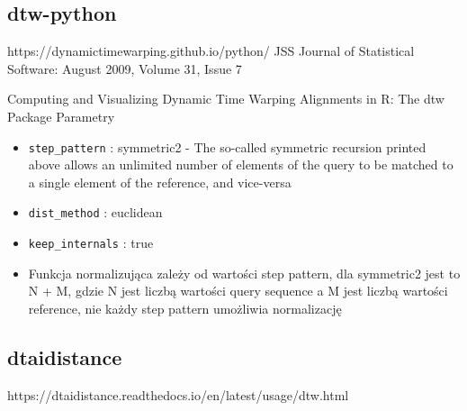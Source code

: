 \subsection{dtw-python}
https://dynamictimewarping.github.io/python/
\newline
JSS Journal of Statistical Software: August 2009, Volume 31, Issue 7 \par
Computing and Visualizing Dynamic Time Warping
Alignments in R: The dtw Package
\newline Parametry \begin{itemize}
    \item {\texttt{step\_pattern} : symmetric2} - The so-called symmetric recursion printed above allows an unlimited number of elements of the query to be matched to a single element of the reference, and vice-versa
    \item {\texttt{dist\_method} : euclidean}
    \item {\texttt{keep\_internals} : true}
    \item {Funkcja normalizująca zależy od wartości step pattern, dla symmetric2 jest to N + M, gdzie N jest liczbą wartości
query sequence a M jest liczbą wartości reference, nie każdy step pattern umożliwia normalizację}
\end{itemize}

\subsection{dtaidistance}
https://dtaidistance.readthedocs.io/en/latest/usage/dtw.html



